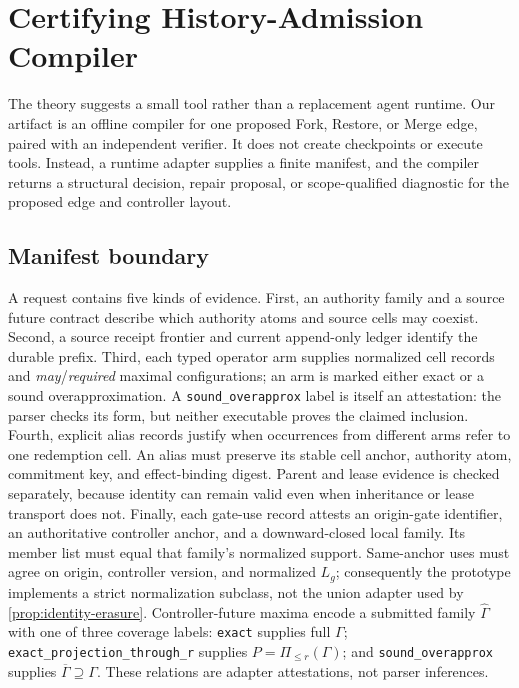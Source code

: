 \section{Certifying History-Admission Compiler}
\label{sec:algorithm}

The theory suggests a small tool rather than a replacement agent runtime.
Our artifact is an offline compiler for one proposed Fork, Restore, or Merge
edge, paired with an independent verifier.
It does not create checkpoints or execute tools.
Instead, a runtime adapter supplies a finite manifest, and the compiler
returns a structural decision, repair proposal, or scope-qualified diagnostic
for the proposed edge and controller layout.

\subsection{Manifest boundary}

A request contains five kinds of evidence.
First, an authority family and a source future contract describe which
authority atoms and source cells may coexist.
Second, a source receipt frontier and current append-only ledger identify the
durable prefix.
Third, each typed operator arm supplies normalized cell records and
\emph{may}/\emph{required} maximal configurations; an arm is marked either
exact or a sound overapproximation.
A \texttt{sound\_overapprox} label is itself an attestation: the parser checks
its form, but neither executable proves the claimed inclusion.
Fourth, explicit alias records justify when occurrences from different arms
refer to one redemption cell.
An alias must preserve its stable cell anchor, authority atom, commitment key,
and effect-binding digest.
Parent and lease evidence is checked separately, because identity can remain
valid even when inheritance or lease transport does not.
Finally, each gate-use record attests an origin-gate identifier, an
authoritative controller anchor, and a downward-closed local family.  Its
member list must equal that family's normalized support.  Same-anchor uses
must agree on origin, controller version, and normalized $L_g$; consequently
the prototype implements a strict normalization subclass, not the union
adapter used by \cref{prop:identity-erasure}.  Controller-future
maxima encode a submitted family $\widehat\Gamma$ with one of three coverage
labels: \texttt{exact} supplies full $\Gamma$;
\texttt{exact\_projection\_through\_r} supplies
$P=\Pi_{\leq r}(\Gamma)$; and \texttt{sound\_overapprox} supplies
$\overline\Gamma\supseteq\Gamma$.  These relations are adapter attestations,
not parser inferences.

